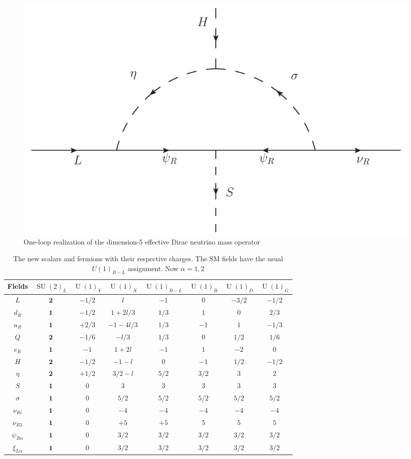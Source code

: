 \documentclass[12pt]{article}
\begin{document}
\begin{figure}
\centering
\includegraphics[scale=0.75]{Neutrino2.pdf}
\caption{One-loop realization of the dimension-5 effective Dirac neutrino mass operator }
\label{fig:ld5}
\end{figure}
%

\begin{table}
  \centering
  \begin{tabular}{|c|c|c|c|c|c|c|c|}
    \hline  
    Fields     & $\operatorname{SU}(2)_L$ & $\operatorname{U}(1)_Y $ & $\operatorname{U}(1)_{X}$& $\operatorname{U}(1)_{B-L}$& $\operatorname{U}(1)_B$& $\operatorname{U}(1)_D$& $\operatorname{U}(1)_G$\\ \hline
$L $  & $\boldsymbol{2}$& $-1/2$  &  $l$&  $-1$&    $0$ &  $-3/2$&  $-1/2$ \\    
$d_R $  & $\boldsymbol{1}$& $-1/2$  &  $1+2l/3$&  $1/3$&    $1$&  $0$&  $2/3$ \\
$u_R $  & $\boldsymbol{1}$& $+2/3$  &  $-1-4l/3$&  $1/3$&   $-1$&  $1$&  $-1/3$ \\
$Q $  & $\boldsymbol{2}$& $-1/6$  &  $-l/3$& $1/3$&    $0$&  $1/2$&  $1/6$ \\\hline
$e_R $  & $\boldsymbol{1}$& $-1$  &  $1+2l$&  $-1$&    $1$ &  $-2$&  $0$ \\
$H $  & $\boldsymbol{2}$& $-1/2$  &  $-1-l$&  $0$&    $-1$ &  $1/2$&  $-1/2$ \\
$\eta$  & $\boldsymbol{2}$ & $+1/2$  & $3/2-l$& $5/2$& $3/2$ &$3$&$2$ \\
$S$ & $\boldsymbol{1}$ & $0$  & $3$& $3$&  $3$ & $3$& $3$ \\
$\sigma$ & $\boldsymbol{1}$ & $0$ & $5/2$& $5/2$&  $5/2$ & $5/2$& $5/2$ \\
\hline
 $\nu_{Ri}$ & $\boldsymbol{1}$ & $0$ & $-4$& $-4$&  $-4$ & $-4$& $-4$\\
$\nu_{R3}$ & $\boldsymbol{1}$ & $0$ & $+5$& $+5$&  $5$ & $5$& $5$\\
$\psi_{R\alpha}$  & $\boldsymbol{1}$ & $0$& $3/2$ & $3/2$&  $3/2$ & $3/2$& $3/2$ \\\hline
$\xi_{L\alpha}$  & $\boldsymbol{1}$ & $0$ & $3/2$& $3/2$ &  $3/2$ & $3/2$& $3/2$\\\hline
  \end{tabular}
  \caption{The new scalars and fermions with their respective charges. The SM fields have the usual $U(1)_{B-L}$ assignment. Now $\alpha=1,2$}
    \label{tab:partcont2}
\end{table}
\end{document}
